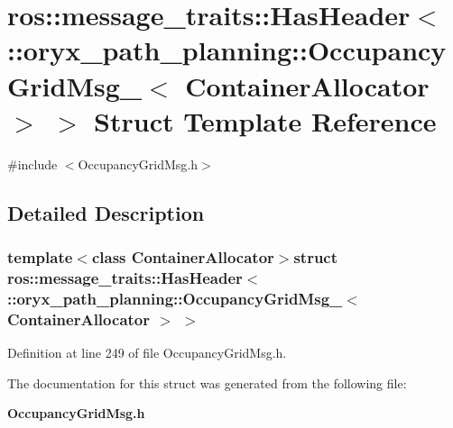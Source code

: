 \section{ros\-:\-:message\-\_\-traits\-:\-:\-Has\-Header$<$ \-:\-:oryx\-\_\-path\-\_\-planning\-:\-:\-Occupancy\-Grid\-Msg\-\_\-$<$ \-Container\-Allocator $>$ $>$ \-Struct \-Template \-Reference}
\label{structros_1_1message__traits_1_1HasHeader_3_01_1_1oryx__path__planning_1_1OccupancyGridMsg___3_01ContainerAllocator_01_4_01_4}


{\ttfamily \#include $<$\-Occupancy\-Grid\-Msg.\-h$>$}



\subsection{\-Detailed \-Description}
\subsubsection*{template$<$class Container\-Allocator$>$struct ros\-::message\-\_\-traits\-::\-Has\-Header$<$ \-::oryx\-\_\-path\-\_\-planning\-::\-Occupancy\-Grid\-Msg\-\_\-$<$ Container\-Allocator $>$ $>$}



\-Definition at line 249 of file \-Occupancy\-Grid\-Msg.\-h.



\-The documentation for this struct was generated from the following file\-:\begin{DoxyCompactItemize}
\item 
{\bf \-Occupancy\-Grid\-Msg.\-h}\end{DoxyCompactItemize}
